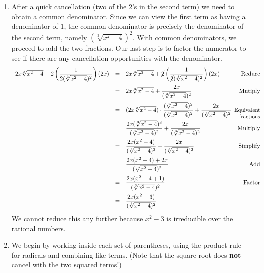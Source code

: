 \documentclass[10pt]{article}
\begin{document}
\begin{ex}
\begin{enumerate}
\item After a quick cancellation (two of the $2$'s in the second term) we need to obtain a common denominator.  Since we can view the first term as having a denominator of $1$,  the common denominator is precisely the denominator of the second term, namely $(\sqrt[3]{x^2-4})^2$.  With common denominators, we proceed to add the two fractions.  Our last step is to factor the numerator to see if there are any cancellation opportunities with the denominator.\[ \begin{array}{rclr}

2x \sqrt[3]{x^2-4} + 2\left(\dfrac{1}{2(\sqrt[3]{x^2-4})^2}\right)  (2x) & = & 2x \sqrt[3]{x^2-4} + \cancel{2}\left(\dfrac{1}{\cancel{2}(\sqrt[3]{x^2-4})^2}\right)  (2x) & \text{Reduce}\\ [12pt]

& = & 2x \sqrt[3]{x^2-4} + \dfrac{2x}{(\sqrt[3]{x^2-4})^2} & \text{Mutiply} \\[12pt]

& = & (2x \sqrt[3]{x^2-4}) \cdot \dfrac{(\sqrt[3]{x^2-4})^2}{(\sqrt[3]{x^2-4})^2} + \dfrac{2x}{(\sqrt[3]{x^2-4})^2} & \hspace*{-.1in}\text{\small Equivalent} \\ [-8pt]
&   &                                                                                                               & \text{\small fractions} \\

& = & \dfrac{2x(\sqrt[3]{x^2-4})^3}{(\sqrt[3]{x^2-4})^2} + \dfrac{2x}{(\sqrt[3]{x^2-4})^2} & \text{Multiply}\\[12pt]

& = & \dfrac{2x(x^2-4)}{(\sqrt[3]{x^2-4})^2} + \dfrac{2x}{(\sqrt[3]{x^2-4})^2} & \text{Simplify}\\ [12pt]

& = & \dfrac{2x(x^2-4) + 2x}{(\sqrt[3]{x^2-4})^2} & \text{Add} \\ [12pt]


& = & \dfrac{2x(x^2-4 +1)}{(\sqrt[3]{x^2-4})^2} & \text{Factor}\\ [12pt]


& = & \dfrac{2x(x^2-3)}{(\sqrt[3]{x^2-4})^2} & \\

\end{array}\] We cannot reduce this any further because $x^2 - 3$ is irreducible over the rational numbers. 


\item  We begin by working inside each set of parentheses, using the product rule for radicals and combining like terms. (Note that the square root does \textbf{not} cancel with the two squared terms!)\[ \begin{array}{rclr}



\end{array}\]
\end{enumerate}
\end{ex}
\end{document}
